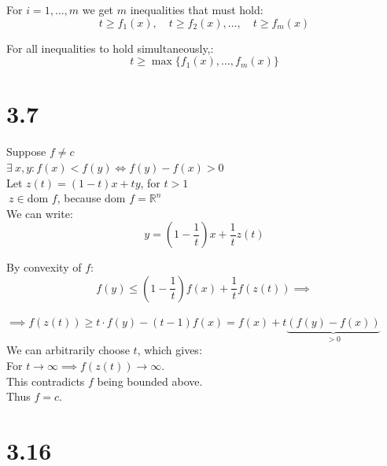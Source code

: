 \documentclass{article}
\begin{document}
\noindent For $i = 1, \dots, m$ we get $m$ inequalities that must hold:
\[ t \geq f_1(x), \quad t \geq f_2(x), \dots, \quad t \geq f_m(x) \]

\noindent For all inequalities to hold simultaneously,:
\[ t \geq \max \{ f_1(x), \dots, f_m(x) \} \]









\newpage

\section*{3.7}

\noindent Suppose $f \neq c$ \\
$\exists \ x, y : f(x) < f(y) \iff f(y) - f(x) > 0$ \\

\noindent Let $z(t) = (1-t)x + ty$, for $t > 1$ \\
$ \ z \in \text{dom } f$, because $\text{dom } f = \mathbb{R}^n$ \\

\noindent We can write:
\[ y = \left( 1 - \frac{1}{t} \right)x + \frac{1}{t} z(t) \]

\noindent By convexity of $f$:
\[ f(y) \leq \left( 1 - \frac{1}{t} \right) f(x) + \frac{1}{t} f(z(t)) \implies \]

\noindent $\implies f(z(t)) \geq t \cdot f(y) - (t - 1) f(x) = f(x) + t \underbrace{(f(y) - f(x))}_{> 0}$ \\

\noindent We can arbitrarily choose $t$, which gives: \\

\noindent For $t \to \infty \implies f(z(t)) \to \infty$. \\

\noindent This contradicts $f$ being bounded above. \\

\noindent Thus $f = c$.





















\newpage
\section*{3.16}
\end{document}
